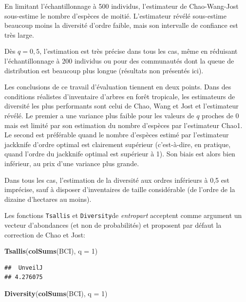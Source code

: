 \documentclass[
  11pt,
  french,
  a4paper,
  extrafontsizes,onecolumn,openright
  ]{memoir}
\newenvironment{Shaded}{\begin{snugshade}}{\end{snugshade}}
\newcommand{\AttributeTok}[1]{\textcolor[rgb]{0.13,0.29,0.53}{#1}}
\newcommand{\DecValTok}[1]{\textcolor[rgb]{0.00,0.00,0.81}{#1}}
\newcommand{\FunctionTok}[1]{\textcolor[rgb]{0.13,0.29,0.53}{\textbf{#1}}}
\newcommand{\NormalTok}[1]{#1}
\newlength{\rf}
\begin{document}
En limitant l'échantillonnage à 500 individus, l'estimateur de Chao-Wang-Jost sous-estime le nombre d'espèces de moitié.
L'estimateur révélé sous-estime beaucoup moins la diversité d'ordre faible, mais son intervalle de confiance est très large.

Dès \(q=0,5\), l'estimation est très précise dans tous les cas, même en réduisant l'échantillonnage à 200 individus ou pour des communautés dont la queue de distribution est beaucoup plus longue (résultats non présentés ici).

Les conclusions de ce travail d'évaluation tiennent en deux points.
Dans des conditions réalistes d'inventaire d'arbres en forêt tropicale, les estimateurs de diversité les plus performants sont celui de Chao, Wang et Jost et l'estimateur révélé.
Le premier a une variance plus faible pour les valeurs de \(q\) proches de 0 mais est limité par son estimation du nombre d'espèces par l'estimateur Chao1.
Le second est préférable quand le nombre d'espèces estimé par l'estimateur jackknife d'ordre optimal est clairement supérieur (c'est-à-dire, en pratique, quand l'ordre du jackknife optimal est supérieur à 1).
Son biais est alors bien inférieur, au prix d'une variance plus grande.

Dans tous les cas, l'estimation de la diversité aux ordres inférieurs à 0,5 est imprécise, sauf à disposer d'inventaires de taille considérable (de l'ordre de la dizaine d'hectares au moins).

Les fonctions \texttt{Tsallis} et \texttt{Diversity}de \emph{entropart} acceptent comme argument un vecteur d'abondances (et non de probabilités) et proposent par défaut la correction de Chao et Jost:

\scriptsize

\begin{Shaded}
\begin{Highlighting}[]
\FunctionTok{Tsallis}\NormalTok{(}\FunctionTok{colSums}\NormalTok{(BCI), }\AttributeTok{q =} \DecValTok{1}\NormalTok{)}
\end{Highlighting}
\end{Shaded}

\begin{verbatim}
##  UnveilJ 
## 4.276075
\end{verbatim}

\begin{Shaded}
\begin{Highlighting}[]
\FunctionTok{Diversity}\NormalTok{(}\FunctionTok{colSums}\NormalTok{(BCI), }\AttributeTok{q =} \DecValTok{1}\NormalTok{)}
\end{Highlighting}
\end{Shaded}
\end{document}
